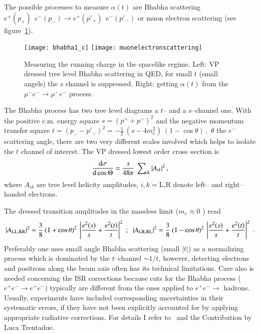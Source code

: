 \documentclass[epj,onecolumn]{webofc}
\newcommand{\ha}{\frac12 }
\newcommand{\mbo}[1]{$#1$ }
\newcommand{\epm}{e^+e^- }
\newcommand{\D}{\rm d }
\newcommand{\semis}{\;;\;\; }
\newcommand{\bea}{\begin{eqnarray}}
\newcommand{\eea}{\end{eqnarray}}
\newcommand{\epo}{\;. }
\begin{document}
The possible processes to measure $\alpha(t)$ are Bhabha
scattering $ e^+(p_+)\:\:e^-(p_-) \to e^+(p'_+)\:\:e^-(p'_-)$
or muon electron scattering (see figure~\ref{fig:processes}).
\begin{figure}[h]
\centering
\texttt{[image: bhabha1\_c]}
\texttt{[image: muonelectronscattering]}
\caption{Measuring the running charge in the spacelike regime.
Left: VP dressed tree level Bhabha scattering in QED, for small $t$
(small angels) the $s$ channel is suppressed.
Right: getting $\alpha(t)$ from the $\mu^-e^- \to \mu^-e^-$ process.}
\label{fig:processes}
\end{figure}
The Bhabha process has two tree level diagrams a $t$-- and a
$s$--channel one. With the
positive c.m. energy square $ s=(p^++p^-)^2$ and the negative momentum
transfer square $ t=(p_--p'_-)^2=-\ha \: (s-4m_e^2)\:(1-\cos
\theta)\,,$ $ \theta$ the $ e^-$ scattering angle, there are two very
different scales involved which helps to isolate the $t$ channel of interest.
The VP dressed lowest order cross--section is
\bea
\frac{\D \sigma}{\D \cos \Theta}= \frac{s}{48\pi}\:\sum\nolimits_{ik}|A_{ik}|^2\,,
\eea
where $ A_{ik}$ are tree level helicity amplitudes, $i,k=$L,R denote left--
and right--handed electrons.

The dressed transition amplitudes in the massless limit
(\mbo{m_e\approx 0}) read
\bea
|A_{\rm LL,RR}|^2=\frac{3}{8}\:(1+\cos
\theta)^2\:\left|\frac{e^2(s)}{s}+\frac{e^2(t)}{t}\right|^2 \semis
|A_{\rm LR,RL}|^2=\frac{3}{8}\:(1-\cos
\theta)^2\:\left|\frac{e^2(s)}{s}+\frac{e^2(t)}{t}\right|^2 \epo
\eea
Preferably one uses small angle Bhabha scattering (small $|t|$) as a
normalizing process which is dominated by the $t$--channel $\sim
1/t$, however, detecting electrons and positrons along the beam axis
often has its technical limitations. Care also is needed concerning
the ISR corrections because cuts for the Bhabha process ($ \epm \to
\epm$) typically are different from the ones applied to { $\epm \to$
hadrons}. Usually, experiments have included corresponding
uncertainties in their systematic errors, if they have not been explicitly
accounted for by applying appropriate radiative corrections. For details I
refer to~\cite{Calame:2015fva} and the Contribution by Luca Trentadue.
\end{document}
